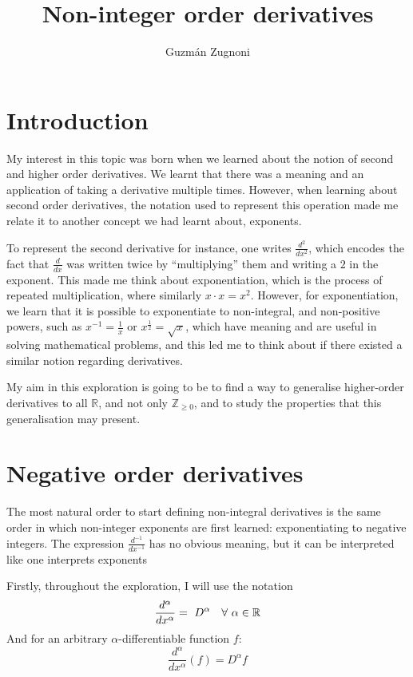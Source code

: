 \documentclass{article}
\author{Guzmán Zugnoni}
\title{Non-integer order derivatives}
\renewcommand{\maketitle}{
\begin{center}
	\Huge\textbf \thetitle
\end{center}
}
\def\squad{\hskip2\fontdimen3\font}
\begin{document}
\maketitle

\newpage

\tableofcontents

\newpage

\section{Introduction}

My interest in this topic was born when we learned about the notion of second
and higher order derivatives. We learnt that there was a meaning and an
application of taking a derivative multiple times. However, when learning about
second order derivatives, the notation used to represent this operation made
me relate it to another concept we had learnt about, exponents.

To represent the second derivative for instance, one writes $\frac{d^2}{dx^2}$,
which encodes the fact that $\frac{d}{dx}$ was written twice by ``multiplying''
them and writing a $2$ in the exponent. This made me think about
exponentiation, which is the process of repeated multiplication, where
similarly $x \cdot x = x^2$. However, for exponentiation, we learn that it is
possible to exponentiate to non-integral, and non-positive powers, such as
$x^{-1}=\frac{1}{x}$ or $x^\frac{1}{2} = \sqrt{x}$, which have meaning and are
useful in solving mathematical problems, and this led me to think about if
there existed a similar notion regarding derivatives.

My aim in this exploration is going to be to find a way to generalise
higher-order derivatives to all $\mathbb{R}$, and not only
$\mathbb{Z}_{\geq0}$, and to study the properties that this generalisation may
present.

\section{Negative order derivatives} \label{neg_order_ders}

The most natural order to start defining non-integral derivatives is the same
order in which non-integer exponents are first learned: exponentiating to
negative integers. The expression $\frac{d^{-1}}{dx^{-1}}$ has no obvious
meaning, but it can be interpreted like one interprets exponents

Firstly, throughout the exploration, I will use the notation
$$  \frac{d^\alpha}{dx^\alpha}=\
	D^\alpha \quad \forall \squad \alpha \in \mathbb{R}$$
And for an arbitrary $\alpha$-differentiable function $f$:
$$\frac{d^\alpha}{dx^\alpha}\left(f\right) = D^\alpha f$$
\end{document}
